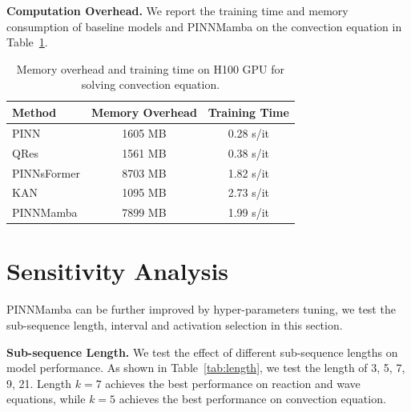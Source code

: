 \documentclass{article}
\theoremstyle{plain}
\theoremstyle{definition}
\theoremstyle{remark}
\begin{document}
\textbf{Computation Overhead.} We report the training time and memory consumption of baseline models and PINNMamba on the convection equation in Table~\ref{tab:training}. 

\begin{table}[H]
\vspace{-3mm}
  \caption{Memory overhead and training time on H100 GPU for solving convection equation. }
  
  \centering
    \small
  \begin{tabular}{lcc}

    \toprule 
    Method & Memory Overhead & Training Time\\
   \midrule
   PINN & 1605 MB & 0.28 s/it \\
   QRes & 1561 MB& 0.38 s/it \\
   PINNsFormer & 8703 MB & 1.82 s/it\\
   KAN & 1095 MB & 2.73 s/it\\
    \midrule
    PINNMamba & 7899 MB & 1.99 s/it\\

   

    \bottomrule
  \end{tabular}
  \normalsize
  \label{tab:training}

\end{table}

\section{Sensitivity Analysis}

PINNMamba can be further improved by hyper-parameters tuning, we test the sub-sequence length, interval and activation selection in this section.

\label{apx:sense}

\textbf{Sub-sequence Length.} We test the effect of different sub-sequence lengths on model performance. As shown in Table~\ref{tab:length}, we test the length of 3, 5, 7, 9, 21.  Length $k =7$ achieves the best performance on reaction and wave equations, while  $k =5$ achieves the best performance on convection equation.
\end{document}
